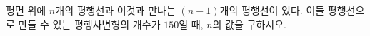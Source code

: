 \hspace*{2mm}\begin{minipage}[t]{\dimexpr\linewidth-2mm\relax}\vspace{0pt}
평면 위에 $n$개의 평행선과 이것과 만나는 $(n-1)$개의 평행선이 있다. 이들 평행선으로 만들 수 있는 평행사변형의 개수가 $150$일 때, $n$의 값을 구하시오. \end{minipage}
